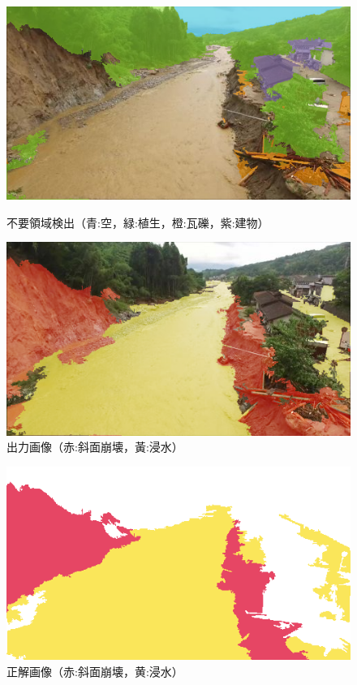 \documentclass[a4paper, twocolumn, xelatex, 9pt, ja=standard, Ligatures=TeX]{bxjsarticle}
\begin{document}
	\begin{figure}[t]
		\begin{minipage}{0.48\hsize}
			\centering
			\includegraphics[width=\linewidth]{img/rejection.png}
			\caption{不要領域検出（青:空，緑:植生，橙:瓦礫，紫:建物）}
			\label{img06}
		\end{minipage}
		\begin{minipage}{0.48\hsize}
			\centering
			\includegraphics[width=\linewidth]{img/result.png}
			\caption{出力画像（赤:斜面崩壊，黃:浸水）}
			\label{img07}
		\end{minipage}
	\end{figure}
	\begin{figure}[t]
		\begin{minipage}{0.48\hsize}
			\centering
			\includegraphics[width=\linewidth]{img/answer.png}
			\caption{正解画像（赤:斜面崩壊，黄:浸水）}
			\label{img08}
		\end{minipage}
	\end{figure}
\end{document}
